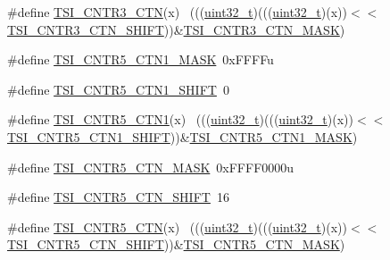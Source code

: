 \begin{DoxyCompactItemize}
\item 
\#define \hyperlink{group___t_s_i___register___masks_ga820fd10f31f0e10f48840243bbc1fe68}{T\+S\+I\+\_\+\+C\+N\+T\+R3\+\_\+\+C\+TN}(x)                                              ~(((\hyperlink{_p_e___types_8h_a33594304e786b158f3fb30289278f5af}{uint32\+\_\+t})(((\hyperlink{_p_e___types_8h_a33594304e786b158f3fb30289278f5af}{uint32\+\_\+t})(x))$<$$<$\hyperlink{group___t_s_i___register___masks_ga7b5cdf80f7cb214a07cc1a08f84dafde}{T\+S\+I\+\_\+\+C\+N\+T\+R3\+\_\+\+C\+T\+N\+\_\+\+S\+H\+I\+FT}))\&\hyperlink{group___t_s_i___register___masks_ga706c452af2d87895eec6b24787418763}{T\+S\+I\+\_\+\+C\+N\+T\+R3\+\_\+\+C\+T\+N\+\_\+\+M\+A\+SK})
\item 
\#define \hyperlink{group___t_s_i___register___masks_ga7c016e770c1a5682417e7f7df4887663}{T\+S\+I\+\_\+\+C\+N\+T\+R5\+\_\+\+C\+T\+N1\+\_\+\+M\+A\+SK}~0x\+F\+F\+F\+Fu
\item 
\#define \hyperlink{group___t_s_i___register___masks_ga1aa3ace6f56df71e799b8c737559e2ab}{T\+S\+I\+\_\+\+C\+N\+T\+R5\+\_\+\+C\+T\+N1\+\_\+\+S\+H\+I\+FT}~0
\item 
\#define \hyperlink{group___t_s_i___register___masks_ga80141145e6a5e1ff736afd93146f5af2}{T\+S\+I\+\_\+\+C\+N\+T\+R5\+\_\+\+C\+T\+N1}(x)                                            ~(((\hyperlink{_p_e___types_8h_a33594304e786b158f3fb30289278f5af}{uint32\+\_\+t})(((\hyperlink{_p_e___types_8h_a33594304e786b158f3fb30289278f5af}{uint32\+\_\+t})(x))$<$$<$\hyperlink{group___t_s_i___register___masks_ga1aa3ace6f56df71e799b8c737559e2ab}{T\+S\+I\+\_\+\+C\+N\+T\+R5\+\_\+\+C\+T\+N1\+\_\+\+S\+H\+I\+FT}))\&\hyperlink{group___t_s_i___register___masks_ga7c016e770c1a5682417e7f7df4887663}{T\+S\+I\+\_\+\+C\+N\+T\+R5\+\_\+\+C\+T\+N1\+\_\+\+M\+A\+SK})
\item 
\#define \hyperlink{group___t_s_i___register___masks_gae1a4f3201c87c0064e434db5a57974a5}{T\+S\+I\+\_\+\+C\+N\+T\+R5\+\_\+\+C\+T\+N\+\_\+\+M\+A\+SK}~0x\+F\+F\+F\+F0000u
\item 
\#define \hyperlink{group___t_s_i___register___masks_ga2de11a65c7ac3cdaa665a69652b26638}{T\+S\+I\+\_\+\+C\+N\+T\+R5\+\_\+\+C\+T\+N\+\_\+\+S\+H\+I\+FT}~16
\item 
\#define \hyperlink{group___t_s_i___register___masks_gae9d2366ee549d24dd790fc999fe7b1bf}{T\+S\+I\+\_\+\+C\+N\+T\+R5\+\_\+\+C\+TN}(x)                                              ~(((\hyperlink{_p_e___types_8h_a33594304e786b158f3fb30289278f5af}{uint32\+\_\+t})(((\hyperlink{_p_e___types_8h_a33594304e786b158f3fb30289278f5af}{uint32\+\_\+t})(x))$<$$<$\hyperlink{group___t_s_i___register___masks_ga2de11a65c7ac3cdaa665a69652b26638}{T\+S\+I\+\_\+\+C\+N\+T\+R5\+\_\+\+C\+T\+N\+\_\+\+S\+H\+I\+FT}))\&\hyperlink{group___t_s_i___register___masks_gae1a4f3201c87c0064e434db5a57974a5}{T\+S\+I\+\_\+\+C\+N\+T\+R5\+\_\+\+C\+T\+N\+\_\+\+M\+A\+SK})
$$
\end{DoxyCompactItemize}
